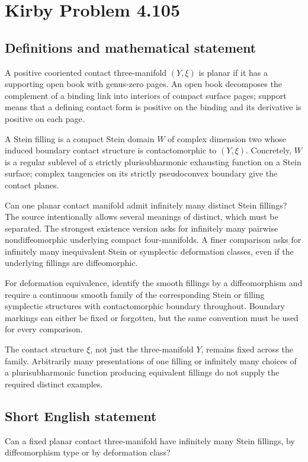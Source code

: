 \documentclass[11pt,a4paper]{article}
\begin{document}
\section*{Kirby Problem 4.105}\label{statement}

\subsection{Definitions and mathematical statement}
A positive cooriented contact three-manifold $(Y,\xi)$ is planar if it has a supporting open book with genus-zero pages. An open book decomposes the complement of a binding link into interiors of compact surface pages; support means that a defining contact form is positive on the binding and its derivative is positive on each page.

A Stein filling is a compact Stein domain $W$ of complex dimension two whose induced boundary contact structure is contactomorphic to $(Y,\xi)$. Concretely, $W$ is a regular sublevel of a strictly plurisubharmonic exhausting function on a Stein surface; complex tangencies on its strictly pseudoconvex boundary give the contact planes.

Can one planar contact manifold admit infinitely many distinct Stein fillings? The source intentionally allows several meanings of distinct, which must be separated. The strongest existence version asks for infinitely many pairwise nondiffeomorphic underlying compact four-manifolds. A finer comparison asks for infinitely many inequivalent Stein or symplectic deformation classes, even if the underlying fillings are diffeomorphic.

For deformation equivalence, identify the smooth fillings by a diffeomorphism and require a continuous smooth family of the corresponding Stein or filling symplectic structures with contactomorphic boundary throughout. Boundary markings can either be fixed or forgotten, but the same convention must be used for every comparison.

The contact structure $\xi$, not just the three-manifold $Y$, remains fixed across the family. Arbitrarily many presentations of one filling or infinitely many choices of a plurisubharmonic function producing equivalent fillings do not supply the required distinct examples.
\subsection{Short English statement}
Can a fixed planar contact three-manifold have infinitely many Stein fillings, by diffeomorphism type or by deformation class?
\end{document}
